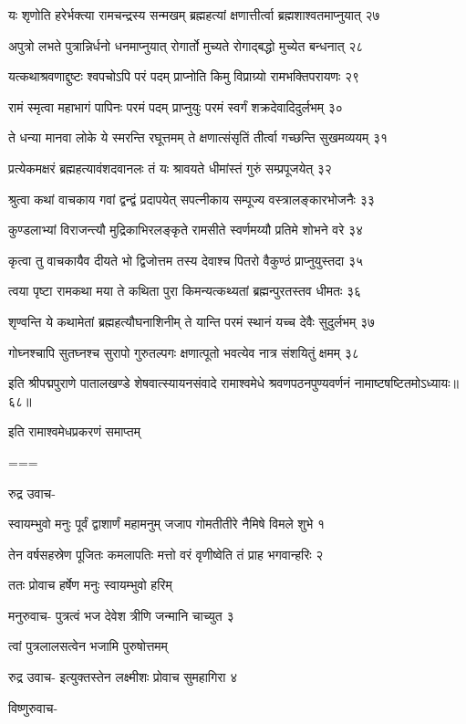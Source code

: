 यः शृणोति हरेर्भक्त्या रामचन्द्रस्य सन्मखम्
ब्रह्महत्यां क्षणात्तीर्त्वा ब्रह्मशाश्वतमाप्नुयात् २७

अपुत्रो लभते पुत्रान्निर्धनो धनमाप्नुयात्
रोगार्तो मुच्यते रोगाद्बद्धो मुच्येत बन्धनात् २८

यत्कथाश्रवणाद्दुष्टः श्वपचोऽपि परं पदम्
प्राप्नोति किमु विप्राग्र्यो रामभक्तिपरायणः २९

रामं स्मृत्वा महाभागं पापिनः परमं पदम्
प्राप्नुयुः परमं स्वर्गं शक्रदेवादिदुर्लभम् ३०

ते धन्या मानवा लोके ये स्मरन्ति रघूत्तमम्
ते क्षणात्संसृतिं तीर्त्वा गच्छन्ति सुखमव्ययम् ३१

प्रत्येकमक्षरं ब्रह्महत्यावंशदवानलः
तं यः श्रावयते धीमांस्तं गुरुं सम्प्रपूजयेत् ३२

श्रुत्वा कथां वाचकाय गवां द्वन्द्वं प्रदापयेत्
सपत्नीकाय सम्पूज्य वस्त्रालङ्कारभोजनैः ३३

कुण्डलाभ्यां विराजन्त्यौ मुद्रिकाभिरलङ्कृते
रामसीते स्वर्णमय्यौ प्रतिमे शोभने वरे ३४

कृत्वा तु वाचकायैव दीयते भो द्विजोत्तम
तस्य देवाश्च पितरो वैकुण्ठं प्राप्नुयुस्तदा ३५

त्वया पृष्टा रामकथा मया ते कथिता पुरा
किमन्यत्कथ्यतां ब्रह्मन्पुरतस्तव धीमतः ३६

शृण्वन्ति ये कथामेतां ब्रह्महत्यौघनाशिनीम्
ते यान्ति परमं स्थानं यच्च देवैः सुदुर्लभम् ३७

गोघ्नश्चापि सुतघ्नश्च सुरापो गुरुतल्पगः
क्षणात्पूतो भवत्येव नात्र संशयितुं क्षमम् ३८

इति श्रीपद्मपुराणे पातालखण्डे शेषवात्स्यायनसंवादे रामाश्वमेधे श्रवणपठनपुण्यवर्णनं नामाष्टषष्टितमोऽध्यायः॥६८॥

इति रामाश्वमेधप्रकरणं समाप्तम्

===


रुद्र उवाच-

स्वायम्भुवो मनुः पूर्वं द्वाशार्णं महामनुम्
जजाप गोमतीतीरे नैमिषे विमले शुभे १

तेन वर्षसहस्रेण पूजितः कमलापतिः
मत्तो वरं वृणीष्वेति तं प्राह भगवान्हरिः २

ततः प्रोवाच हर्षेण मनुः स्वायम्भुवो हरिम्

मनुरुवाच-
पुत्रत्वं भज देवेश त्रीणि जन्मानि चाच्युत ३

त्वां पुत्रलालसत्वेन भजामि पुरुषोत्तमम्

रुद्र उवाच-
इत्युक्तस्तेन लक्ष्मीशः प्रोवाच सुमहागिरा ४

विष्णुरुवाच-

